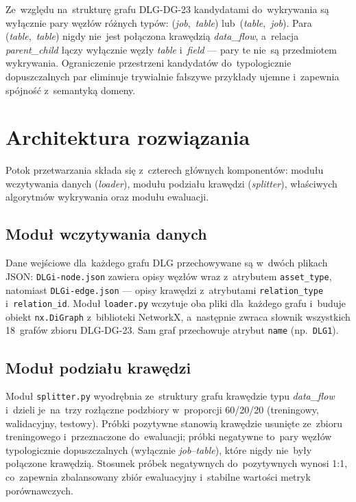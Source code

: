 Ze~względu na~strukturę grafu DLG-DG-23 kandydatami do~wykrywania
są wyłącznie pary węzłów różnych typów: (\emph{job},~\emph{table})
lub~(\emph{table},~\emph{job}). Para (\emph{table},~\emph{table})
nigdy nie~jest połączona krawędzią \emph{data\_flow}, a~relacja
\emph{parent\_child} łączy wyłącznie węzły \emph{table} i~\emph{field}
— pary te nie~są przedmiotem wykrywania. Ograniczenie przestrzeni
kandydatów do~typologicznie dopuszczalnych par eliminuje trywialnie
fałszywe przykłady ujemne i~zapewnia spójność z~semantyką domeny.

\section{Architektura rozwiązania}
\label{sec:architektura}

Potok przetwarzania składa się z~czterech głównych komponentów:
modułu wczytywania danych (\emph{loader}), modułu podziału krawędzi
(\emph{splitter}), właściwych algorytmów wykrywania oraz modułu
ewaluacji.


\subsection{Moduł wczytywania danych}

Dane wejściowe dla~każdego grafu DLG przechowywane są w~dwóch plikach
JSON: \texttt{DLGi-node.json} zawiera opisy węzłów wraz z~atrybutem
\texttt{asset\_type}, natomiast \texttt{DLGi-edge.json} — opisy
krawędzi z~atrybutami \texttt{relation\_type} i~\texttt{relation\_id}.
Moduł \texttt{loader.py} wczytuje oba pliki dla~każdego grafu i~buduje
obiekt \texttt{nx.DiGraph} z~biblioteki NetworkX, a~następnie zwraca
słownik wszystkich 18~grafów zbioru DLG-DG-23. Sam graf przechowuje
atrybut \texttt{name} (np.\ \texttt{DLG1}).

\subsection{Moduł podziału krawędzi}

Moduł \texttt{splitter.py} wyodrębnia ze~struktury grafu krawędzie
typu \emph{data\_flow} i~dzieli je~na~trzy rozłączne podzbiory
w~proporcji 60/20/20 (treningowy, walidacyjny, testowy). Próbki
pozytywne stanowią krawędzie usunięte ze~zbioru treningowego
i~przeznaczone do~ewaluacji; próbki negatywne to~pary węzłów
typologicznie dopuszczalnych (wyłącznie \emph{job}--\emph{table}),
które nigdy nie~były połączone krawędzią. Stosunek próbek negatywnych
do~pozytywnych wynosi 1:1, co~zapewnia zbalansowany zbiór ewaluacyjny
i~stabilne wartości metryk porównawczych.


